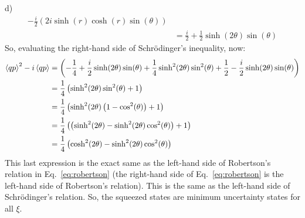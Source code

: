 \begin{homeworkProblem}[Problem 10]
\begin{homeworkSection}{d)}
\begin{align}
   - \frac{i}{2} \left( 2 i \sinh(r) \cosh(r) \sin(\theta) \right) \\
   &= \frac{i}{2} + \frac{1}{2}\sinh(2\theta) \sin(\theta)
\end{align}
So, evaluating the right-hand side of Schr\"{o}dinger's inequality, now:
\begin{align}
   \braket{qp}^2 - i \braket{qp} &=
   \left( - \frac{1}{4} + \frac{i}{2} \sinh(2\theta) \sin(\theta) +
   \frac{1}{4} \sinh^2(2\theta)\sin^2(\theta) + \frac{1}{2} - \frac{i}{2} \sinh(2\theta)\sin(\theta) \right)
   \\
   &= \frac{1}{4} \left( \sinh^2(2\theta) \sin^2(\theta) + 1 \right) \\
   &= \frac{1}{4} \left( \sinh^2(2\theta) \left( 1 - \cos^2(\theta) \right) + 1
\right) \\
   &= \frac{1}{4} \left( \left( \sinh^2(2\theta) - \sinh^2(2\theta)
   \cos^2(\theta) \right) + 1 \right) \\
   &= \frac{1}{4} \left( \cosh^2(2\theta) - \sinh^2(2\theta) \cos^2(\theta) \right)
\end{align}
This last expression is the exact same as the left-hand side of Robertson's
relation in Eq.~\ref{eq:robertson} (the right-hand side of
Eq.~\ref{eq:robertson} is the left-hand side of Robertson's relation). This is
the same as the left-hand side of Schr\"{o}dinger's relation. So, the squeezed
states are minimum uncertainty states for all $ \xi $.
\end{homeworkSection}
\end{homeworkProblem}
